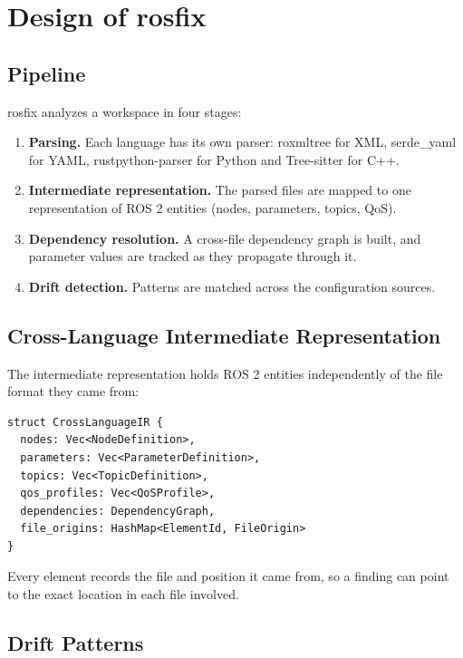 \documentclass[conference]{IEEEtran}
\begin{document}
\section{Design of rosfix}
\label{sec:design}

\subsection{Pipeline}

rosfix analyzes a workspace in four stages:
\begin{enumerate}
\item \textbf{Parsing.} Each language has its own parser: roxmltree for XML, serde\_yaml for
  YAML, rustpython-parser for Python and Tree-sitter for C++.
\item \textbf{Intermediate representation.} The parsed files are mapped to one representation
  of ROS 2 entities (nodes, parameters, topics, QoS).
\item \textbf{Dependency resolution.} A cross-file dependency graph is built, and parameter
  values are tracked as they propagate through it.
\item \textbf{Drift detection.} Patterns are matched across the configuration sources.
\end{enumerate}

\subsection{Cross-Language Intermediate Representation}

The intermediate representation holds ROS 2 entities independently of the file format they came
from:
\begin{lstlisting}
struct CrossLanguageIR {
  nodes: Vec<NodeDefinition>,
  parameters: Vec<ParameterDefinition>,
  topics: Vec<TopicDefinition>,
  qos_profiles: Vec<QoSProfile>,
  dependencies: DependencyGraph,
  file_origins: HashMap<ElementId, FileOrigin>
}
\end{lstlisting}
Every element records the file and position it came from, so a finding can point to the exact
location in each file involved.

\subsection{Drift Patterns}
\end{document}
